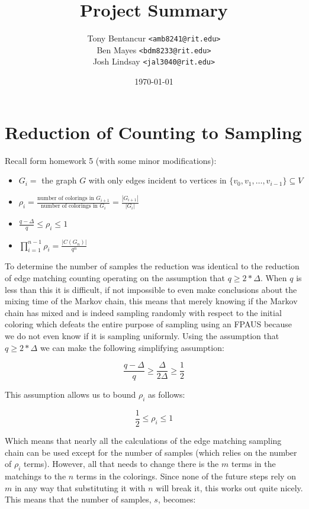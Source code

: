 \documentclass[14]{article}
\begin{document}
\title{Project Summary}
\author{Tony Bentancur \texttt{<amb8241@rit.edu>}\\ Ben Mayes \texttt{<bdm8233@rit.edu>}\\ Josh Lindsay \texttt{<jal3040@rit.edu>}}
\date{\today}
\maketitle
\section{Reduction of Counting to Sampling}
Recall form homework 5 (with some minor modifications):	
\begin{itemize}
\item $\displaystyle G_i = $ the graph $G$ with only edges incident to vertices in $\{v_0, v_1, \ldots ,v_{i-1}\} \subseteq V$
\item $\displaystyle\rho_i = \frac{\mbox{number of colorings in } G_{i+1} }{\mbox{number of colorings in } G_{i} } = \frac{|G_{i+1}|}{|G_{i}|}$
\item $\displaystyle\frac{q-\Delta}{q} \leq \rho_i \leq 1$
\item $\displaystyle\prod_{i=1}^{n-1}{\rho_i} = \frac{|C(G_n)|}{q^n}$
\end{itemize}

To determine the number of samples the reduction was identical to the reduction of edge matching counting operating on the assumption that $q \geq 2*\Delta$. When $q$ is less than this it is difficult, if not impossible to even make conclusions about the mixing time of the Markov chain, this means that merely knowing if the Markov chain has mixed and is indeed sampling randomly with respect to the initial coloring which defeats the entire purpose of sampling using an FPAUS because we do not even know if it is sampling uniformly. Using the assumption that $q \geq 2*\Delta$ we can make the following simplifying assumption:

\[ \frac{q-\Delta}{q} \geq \frac{\Delta}{2\Delta} \geq \frac{1}{2} \]

This assumption allows us to bound $\rho_i$ as follows:

\[ \frac{1}{2} \leq \rho_i \leq 1 \]

Which means that nearly all the calculations of the edge matching sampling chain can be used except for the number of samples (which relies on the number of $\rho_i$ terms). However, all that needs to change there is the $m$ terms in the matchings to the $n$ terms in the colorings. Since none of the future steps rely on $m$ in any way that substituting it with $n$ will break it, this works out quite nicely. This means that the number of samples, $s$, becomes:
\end{document}
